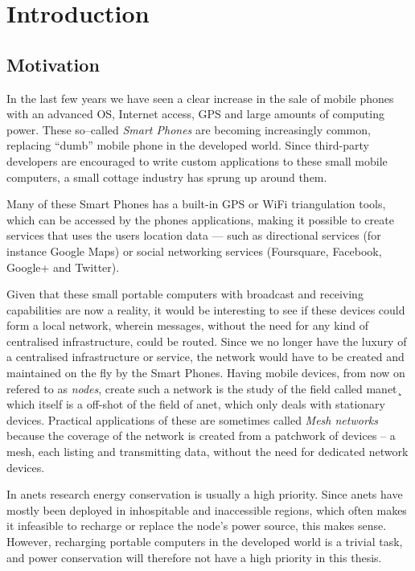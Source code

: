 \section{Introduction}
\label{section:introduction} 

\subsection{Motivation}

In the last few years we have seen a clear increase in the sale of mobile phones with an advanced OS, Internet access, GPS and large amounts of computing power. These so--called \emph{Smart Phones} are becoming increasingly common, replacing ``dumb'' mobile phone in the developed world. Since third-party developers are encouraged to write custom applications to these small mobile computers, a small cottage industry has sprung up around them.
 
Many of these Smart Phones has a built-in GPS or WiFi triangulation tools, which can be accessed by the phones applications, making it possible to create services that uses the users location data --- such as directional services (for instance Google Maps) or social networking services (Foursquare, Facebook, Google+ and Twitter).

Given that these small portable computers with broadcast and receiving capabilities are now a reality, it would be interesting to see if these devices could form a local network, wherein messages, without the need for any kind of centralised infrastructure, could be routed. Since we no longer have the luxury of a centralised infrastructure or service, the network would have to be created and maintained on the fly by the Smart Phones. Having mobile devices, from now on refered to as \emph{nodes}, create such a network is the study of the field called \ac{manet}¸ which itself is a off-shot of the field of \ac{anet}, which only deals with stationary devices. Practical applications of these are sometimes called \emph{Mesh networks} because the coverage of the network is created from a patchwork of devices -- a mesh, each listing and transmitting data, without the need for dedicated network devices.  

In \acp{anet} research energy conservation is usually a high priority. Since \acp{anet} have mostly been deployed in inhospitable and inaccessible regions, which often makes it infeasible to recharge or replace the node's power source, this makes sense. However, recharging portable computers in the developed world is a trivial task, and power conservation will therefore not have a high priority in this thesis. 

